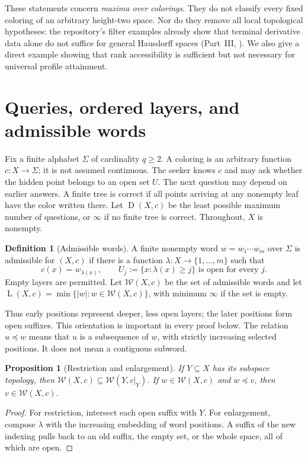 \documentclass[11pt,letterpaper]{article}
\numberwithin{equation}{section}
\newtheorem{proposition}[proposition]{Proposition}
\theoremstyle{definition}
\newtheorem{definition}[definition]{Definition}
\theoremstyle{remark}
\theoremstyle{definition}
\newcommand{\W}{\mathcal W}
\newcommand{\depth}{\operatorname{D}}
\newcommand{\layers}{\operatorname{L}}
\newcommand{\subseq}{\preccurlyeq}
\begin{document}
These statements concern \emph{maxima over colorings}. They do not classify
every fixed coloring of an arbitrary height-two space. Nor do they remove all
local topological hypotheses: the repository's filter examples already show
that terminal derivative data alone do not suffice for general Hausdorff
spaces (Part~III, ). We also give a direct example
showing that rank accessibility is sufficient but not necessary for universal
profile attainment.

\section{Queries, ordered layers, and admissible words}\label{uw:sec:normal}

Fix a finite alphabet $\Sigma$ of cardinality $q\ge2$. A coloring is an
arbitrary function $c:X\to\Sigma$; it is not assumed continuous. The seeker
knows $c$ and may ask whether the hidden point belongs to an open set $U$.
The next question may depend on earlier answers. A finite tree is correct if
all points arriving at any nonempty leaf have the color written there.
Let $\depth(X,c)$ be the least possible maximum number of questions, or $\infty$
if no finite tree is correct. Throughout, $X$ is nonempty.

\begin{definition}[Admissible words]\label{uw:def:word}
A finite nonempty word $w=w_1\cdots w_m$ over $\Sigma$ is admissible for
$(X,c)$ if there is a function $\lambda:X\to\{1,\ldots,m\}$ such that
\begin{equation}\label{uw:eq:admissible}
 c(x)=w_{\lambda(x)},\qquad
 U_j:=\{x:\lambda(x)\ge j\}\text{ is open for every }j.
\end{equation}
Empty layers are permitted. Let $\W(X,c)$ be the set of admissible words and
let $\layers(X,c)=\min\{|w|:w\in\W(X,c)\}$, with minimum $\infty$ if the set
is empty.
\end{definition}

Thus early positions represent deeper, less open layers; the later positions
form open suffixes. This orientation is important in every proof below.
The relation $u\subseq w$ means that $u$ is a subsequence of $w$, with strictly
increasing selected positions. It does not mean a contiguous subword.

\begin{proposition}[Restriction and enlargement]\label{uw:prop:restriction}
If $Y\subseteq X$ has its subspace topology, then
$\W(X,c)\subseteq\W(Y,c|_Y)$. If $w\in\W(X,c)$ and $w\subseq v$, then
$v\in\W(X,c)$.
\end{proposition}
\begin{proof}
For restriction, intersect each open suffix with $Y$. For enlargement,
compose $\lambda$ with the increasing embedding of word positions. A suffix
of the new indexing pulls back to an old suffix, the empty set, or the whole
space, all of which are open.
\end{proof}
\end{document}
